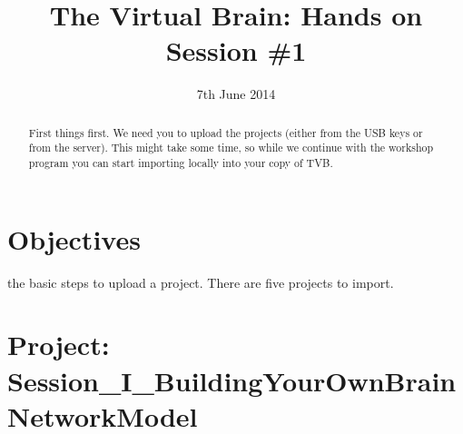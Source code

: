 \documentclass{tufte-handout}
\title{The Virtual Brain: Hands on Session \#1}
\date{7th June 2014}
\begin{document}

\newpage
\ClearWallPaper
\begin{abstract}

First things first. We need you to upload the projects (either from the USB
keys or from the server). This might take some time, so while we continue with
the workshop program you can start importing locally into your copy of TVB.

\end{abstract}



\section{Objectives}\label{sec:objectives}

 the basic steps to upload a project. There are five projects to import.

\section{Project:  Session\_I\_BuildingYourOwnBrainNetworkModel}\label{sec:project_data}
\end{document}
